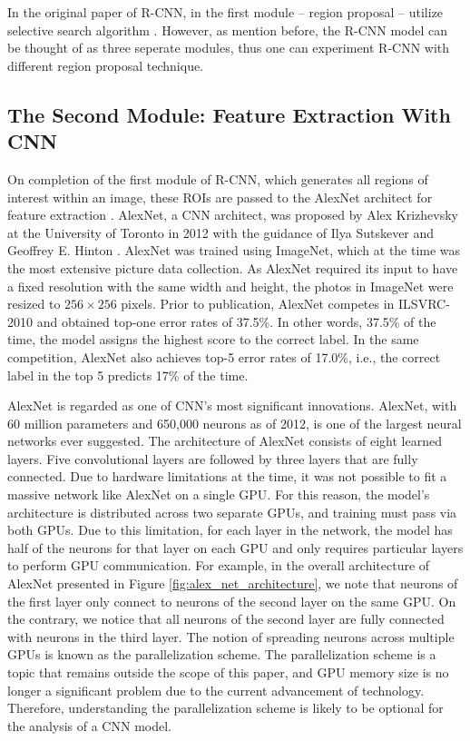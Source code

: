 In the original paper of R-CNN, in the first module -- region proposal -- utilize selective search algorithm \cite{Girshick_R_CNN_2013}. However, as mention before, the R-CNN model can be thought of as three seperate modules, thus one can experiment R-CNN with different region proposal technique.

\subsection{The Second Module: Feature Extraction With CNN}
On completion of the first module of R-CNN, which generates all regions of interest within an image, these ROIs are passed to the AlexNet architect for feature extraction \cite{Girshick_R_CNN_2013}. AlexNet, a CNN architect, was proposed by Alex Krizhevsky at the University of Toronto in 2012 with the guidance of Ilya Sutskever and Geoffrey E. Hinton \cite{AlexNet_2017}. AlexNet was trained using ImageNet, which at the time was the most extensive picture data collection. As AlexNet required its input to have a fixed resolution with the same width and height, the photos in ImageNet were resized to $256 \times 256$ pixels. Prior to publication, AlexNet competes in ILSVRC-2010 and obtained top-one error rates of 37.5\%. In other words, 37.5\% of the time, the model assigns the highest score to the correct label.  In the same competition, AlexNet also achieves top-5 error rates of 17.0\%, i.e., the correct label in the top 5 predicts 17\% of the time.

AlexNet is regarded as one of CNN's most significant innovations. AlexNet, with 60 million parameters and 650,000 neurons as of 2012, is one of the largest neural networks ever suggested. The architecture of AlexNet consists of eight learned layers. Five convolutional layers are followed by three layers that are fully connected. Due to hardware limitations at the time, it was not possible to fit a massive network like AlexNet on a single GPU. For this reason, the model's architecture is distributed across two separate GPUs, and training must pass via both GPUs. Due to this limitation, for each layer in the network, the model has half of the neurons for that layer on each GPU and only requires particular layers to perform GPU communication. For example, in the overall architecture of AlexNet presented in Figure \ref{fig:alex_net_architecture}, we note that neurons of the first layer only connect to neurons of the second layer on the same GPU. On the contrary, we notice that all neurons of the second layer are fully connected with neurons in the third layer. The notion of spreading neurons across multiple GPUs is known as the parallelization scheme. The parallelization scheme is a topic that remains outside the scope of this paper, and GPU memory size is no longer a significant problem due to the current advancement of technology. Therefore, understanding the parallelization scheme is likely to be optional for the analysis of a CNN model.

